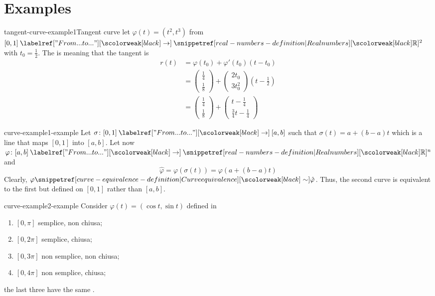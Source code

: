 \documentclass[preview]{standalone}
\begin{document}
\section{Examples}

\begin{snippetexample}{tangent-curve-example1}{Tangent curve}
    let \(\varphi(t) = (t^2, t^3)\) from \([0,1] \fromto \realnumbers^2\) with \(t_0 = \frac{1}{2}\).
    The \curve is \regularcurve meaning that the tangent is
    \begin{align*}
        r(t) &= \varphi(t_0) + \varphi'(t_0)(t-t_0) \\
        &= \begin{pmatrix} \frac{1}{4} \\ \frac{1}{8} \end{pmatrix}
        + \begin{pmatrix} 2t_0 \\ 3t_0^2 \end{pmatrix}\left(t-\frac{1}{2}\right) \\
        &= \begin{pmatrix} \frac{1}{4} \\ \frac{1}{8} \end{pmatrix}
        + \begin{pmatrix} t - \frac{1}{4} \\ \frac{3}{4}t - \frac{1}{4} \end{pmatrix}
    \end{align*}
\end{snippetexample}

\begin{snippetexample}{curve-example1-example}{}
    Let \(\sigma \colon [0,1] \fromto [a,b]\) such that \(\sigma(t) = a + (b-a)t\)
    which is a line that maps \([0,1]\) into \([a,b]\).
    Let now \(\varphi \colon [a,b] \fromto \realnumbers^n\)
    and
    \[
        \hat{\varphi} = \varphi(\sigma(t)) = \varphi(a + (b-a)t)
    \]
    Clearly, \(\varphi \curveequivalent \hat{\varphi}\).
    Thus, the second curve is equivalent to the first but defined on \([0,1]\) rather than \([a,b]\).
\end{snippetexample}

\begin{snippetexample}{curve-example2-example}{}
    Consider \(\varphi(t) = (\cos t, \sin t)\) defined in
    \begin{enumerate}
        \item \([0, \pi]\) semplice, non chiusa;
        \item \([0, 2\pi]\) semplice, chiusa;
        \item \([0, 3\pi]\) non semplice, non chiusa;
        \item \([0, 4\pi]\) non semplice, chiusa;
    \end{enumerate}
    the last three have the same \curve[support].
\end{snippetexample}
\end{document}
